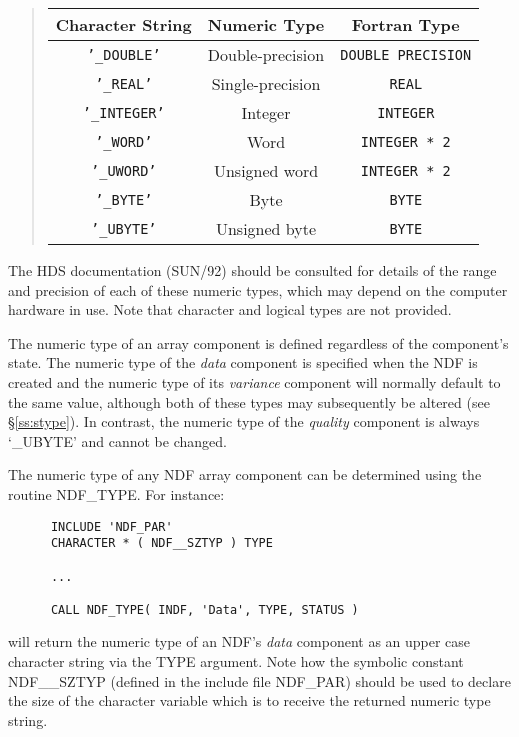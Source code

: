 \documentclass[twoside,11pt]{article}
\newcommand{\htmlref}[2]{#1}
\newcommand{\xref}[3]{#1}
\newcommand{\latex}[1]{#1}
\newcommand{\st}[1]{{\em{#1}}}
\newcommand{\hi}[1]{{\tt{#1}}}
\begin{document}
\small
\begin{quote}
\begin{center}
\begin{tabular}{|c|c|c|}
\hline
{\bf Character String} & {\bf Numeric Type} & {\bf Fortran Type}\\
\hline \hline
\hi{'\_DOUBLE'} & Double-precision & \hi{DOUBLE PRECISION}\\
\hi{'\_REAL'} & Single-precision & \hi{REAL}\\
\hi{'\_INTEGER'} & Integer & \hi{INTEGER}\\
\hi{'\_WORD'} & Word & \hi{INTEGER * 2}\\
\hi{'\_UWORD'} & Unsigned word & \hi{INTEGER * 2}\\
\hi{'\_BYTE'} & Byte & \hi{BYTE}\\
\hi{'\_UBYTE'} & Unsigned byte & \hi{BYTE}\\
\hline
\end{tabular}
\end{center}
\end{quote}
\normalsize

The \xref{HDS documentation}{sun92}{table_of_HDS_data_types}
\latex{(SUN/92)} should be consulted for details of the range and
precision of each of these numeric types, which may depend on the
computer hardware in use.
Note that character and logical types are not provided.

The numeric type of an array component is defined regardless of the
component's state.
The numeric type of the \st{data\/} component is specified when the NDF is
created and the numeric type of its \st{variance\/} component will normally
default to the same value, although both of these types may subsequently be
altered (see \S\ref{ss:stype}). 
In contrast, the numeric type of the \st{quality\/} component is
always `\_UBYTE' and cannot be changed.

The numeric type of any NDF array component can be determined using the 
routine \htmlref{NDF\_TYPE}{NDF_TYPE}.
For instance:

\small
\begin{verbatim}
      INCLUDE 'NDF_PAR'
      CHARACTER * ( NDF__SZTYP ) TYPE

      ...

      CALL NDF_TYPE( INDF, 'Data', TYPE, STATUS )
\end{verbatim}
\normalsize

will return the numeric type of an NDF's \st{data\/} component as an upper
case character string via the TYPE argument. 
Note how the symbolic constant NDF\_\_SZTYP (defined in the include file
NDF\_PAR) should be used to declare the size of the character variable which
is to receive the returned numeric type string. 
\end{document}
